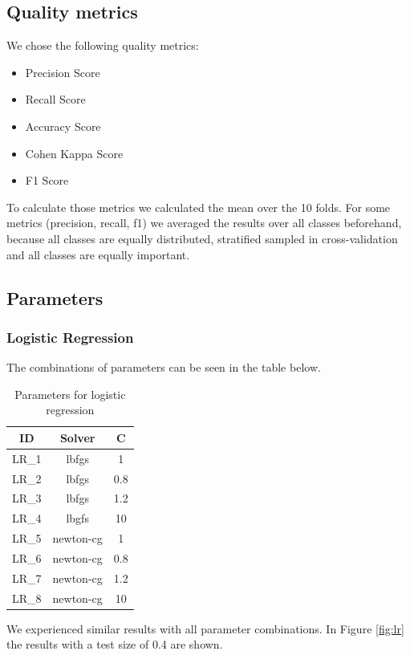 \documentclass{sig-alternate-05-2015}
\begin{document}
\subsection{Quality metrics}

We chose the following quality metrics:
\begin{itemize}
	\item Precision Score
	\item Recall Score
	\item Accuracy Score
	\item Cohen Kappa Score
	\item F1 Score
\end{itemize}

To calculate those metrics we calculated the mean over the 10 folds.
For some metrics (precision, recall, f1) we averaged the results over all classes beforehand, because all classes are equally distributed, stratified sampled in cross-validation and all classes are equally important.

\subsection{Parameters}

\subsubsection{Logistic Regression}
The combinations of parameters can be seen in the table below.

\begin{table}[h]
\label{tbl:1}
\centering
\caption{Parameters for logistic regression}
\begin{tabular}{|c|c|c|}
\hline 
ID & Solver & C \\ 
\hline 
LR\_1 & lbfgs & 1 \\ 
\hline 
LR\_2 & lbfgs & 0.8 \\ 
\hline 
LR\_3 & lbfgs & 1.2 \\ 
\hline 
LR\_4 & lbgfs & 10 \\ 
\hline 
LR\_5 & newton-cg & 1 \\ 
\hline 
LR\_6 & newton-cg & 0.8 \\ 
\hline 
LR\_7 & newton-cg & 1.2 \\ 
\hline 
LR\_8 & newton-cg & 10 \\ 
\hline 
\end{tabular} 
\end{table}

We experienced similar results with all parameter combinations.
In Figure \ref{fig:lr} the results with a test size of 0.4 are shown.
\end{document}
